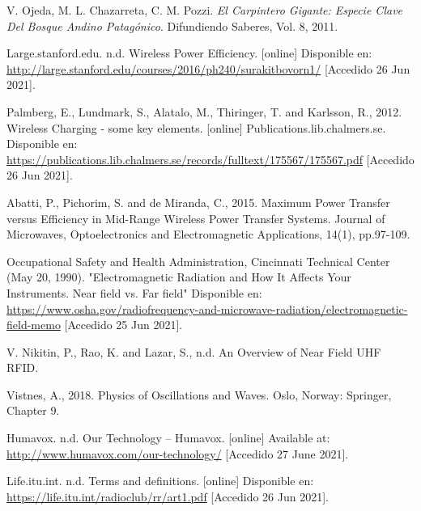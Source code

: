 %

%

\begin{flushleft}
\begin{thebibliography}{9}

V. Ojeda, M. L. Chazarreta, C. M. Pozzi. \textit{El Carpintero Gigante: Especie Clave Del Bosque Andino Patagónico}. Difundiendo Saberes, Vol. 8, 2011.

Large.stanford.edu. n.d. Wireless Power Efficiency. [online] Disponible en: \href{http://large.stanford.edu/courses/2016/ph240/surakitbovorn1/}{http://large.stanford.edu/courses/2016/ph240/surakitbovorn1/} [Accedido 26 Jun 2021].

Palmberg, E., Lundmark, S., Alatalo, M., Thiringer, T. and Karlsson, R., 2012. Wireless Charging - some key elements. [online] Publications.lib.chalmers.se. Disponible en: \href{https://publications.lib.chalmers.se/records/fulltext/175567/175567.pdf}{https://publications.lib.chalmers.se/records/fulltext/175567/175567.pdf} [Accedido 26 Jun 2021].

Abatti, P., Pichorim, S. and de Miranda, C., 2015. Maximum Power Transfer versus Efficiency in Mid-Range Wireless Power Transfer Systems. Journal of Microwaves, Optoelectronics and Electromagnetic Applications, 14(1), pp.97-109.

Occupational Safety and Health Administration, Cincinnati Technical Center (May 20, 1990). "Electromagnetic Radiation and How It Affects Your Instruments. Near field vs. Far field" Disponible en: \href{https://www.osha.gov/radiofrequency-and-microwave-radiation/electromagnetic-field-memo}{https://www.osha.gov/radiofrequency-and-microwave-radiation/electromagnetic-field-memo} [Accedido 25 Jun 2021].

V. Nikitin, P., Rao, K. and Lazar, S., n.d. An Overview of Near Field UHF RFID.

Vistnes, A., 2018. Physics of Oscillations and Waves. Oslo, Norway: Springer, Chapter 9.

Humavox. n.d. Our Technology – Humavox. [online] Available at: \href{http://www.humavox.com/our-technology/}{http://www.humavox.com/our-technology/} [Accedido 27 June 2021].

Life.itu.int. n.d. Terms and definitions. [online] Disponible en: \href{https://life.itu.int/radioclub/rr/art1.pdf}{https://life.itu.int/radioclub/rr/art1.pdf} [Accedido 26 Jun 2021].


\end{thebibliography}
\end{flushleft}
